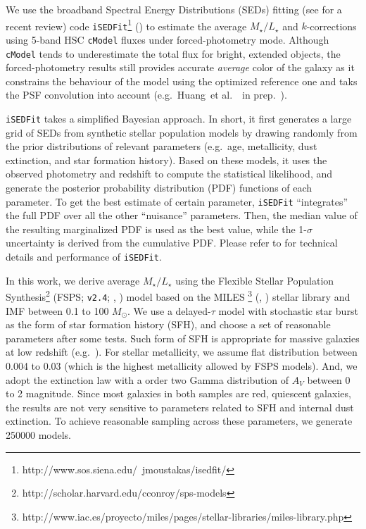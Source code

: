 \documentclass{emulateapj}
\def\msun{$M_\odot$}
\def\etal{{\ et al.~}}
\def\cmodel{\texttt{cModel}}
\def\m2l{{$M_{\star}/L_{\star}$}}
\begin{document}
\begin{CJK*}{UTF8}{gbsn}
    We use the broadband Spectral Energy Distributions (SEDs) fitting 
    (see \citealt{Walcher2011} for a recent review) code 
    \texttt{iSEDFit}\footnote{http://www.sos.siena.edu/~jmoustakas/isedfit/} 
    (\citealt{Moustakas13}) to estimate the average \m2l{} and $k$-corrections using
    5-band HSC \cmodel{} fluxes under forced-photometry mode. 
    Although \cmodel{} tends to underestimate the total flux for bright, extended 
    objects, the forced-photometry results still provides accurate \emph{average} color 
    of the galaxy as it constrains the behaviour of the model using the optimized 
    reference one and taks the PSF convolution into account
    (e.g.\ Huang\etal~in prep.~). 

    \texttt{iSEDFit} takes a simplified Bayesian approach. 
    In short, it first generates a large grid of SEDs from synthetic stellar population 
    models by drawing randomly from the prior distributions of relevant parameters 
    (e.g.\ age, metallicity, dust extinction, and star formation history).
    Based on these models, it uses the observed photometry and redshift to compute the 
    statistical likelihood, and generate the posterior probability distribution (PDF) 
    functions of each parameter.  
    To get the best estimate of certain parameter, \texttt{iSEDFit} ``integrates'' the 
    full PDF over all the other ``nuisance'' parameters.
    Then, the median value of the resulting marginalized PDF is used as the best value, 
    while the 1-$\sigma$ uncertainty is derived from the cumulative PDF. 
    Please refer to \citet{Moustakas13} for technical details and performance of 
    \texttt{iSEDFit}. 
    
    In this work, we derive average \m2l{} using the Flexible Stellar Population 
    Synthesis\footnote{http://scholar.harvard.edu/cconroy/sps-models}
    (FSPS; \texttt{v2.4}; \citealt{FSPS}, \citealt{Conroy2010}) model based on the MILES
    \footnote{http://www.iac.es/proyecto/miles/pages/stellar-libraries/miles-library.php}
    (\citealt{MILES1}, \citealt{MILES2}) stellar library and \citet{Chabrier2003} 
    IMF between 0.1 to 100 \msun. 
    We use a delayed-$\tau$ model with stochastic star burst as the form of star 
    formation history (SFH), and choose a set of reasonable parameters after some tests.  
    Such form of SFH is appropriate for massive galaxies at low redshift 
    (e.g.\ \citealt{Kauffmann2003}). 
    For stellar metallicity, we assume flat distribution between 0.004 to 0.03 (which is 
    the highest metallicity allowed by FSPS models).  
    And, we adopt the \citet{Calzetti2000} extinction law with a order two Gamma 
    distribution of $A_{V}$ between 0 to 2 magnitude.
    Since most galaxies in both samples are red, quiescent galaxies, the results are 
    not very sensitive to parameters related to SFH and internal dust extinction. 
    To achieve reasonable sampling across these parameters, we generate 250000 models. 
    

\end{CJK*}
\end{document}
